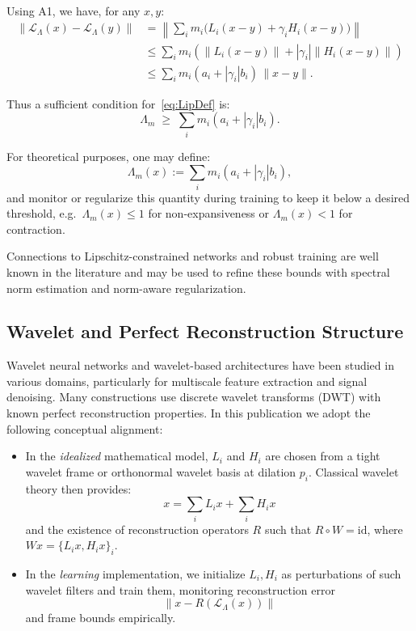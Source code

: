 \documentclass[11pt]{article}
\begin{document}
Using A1, we have, for any $x,y$:
\begin{align}
  \|\mathcal{L}_\Lambda(x) - \mathcal{L}_\Lambda(y)\|
  &= \left\|\sum_i m_i \bigl(L_i (x-y) + \gamma_i H_i (x-y)\bigr)\right\| \nonumber\\[3pt]
  &\le \sum_i m_i \left(\|L_i(x-y)\| + |\gamma_i|\|H_i(x-y)\|\right) \nonumber\\[3pt]
  &\le \sum_i m_i (a_i + |\gamma_i|b_i) \,\|x-y\|.
\end{align}

Thus a sufficient condition for~\eqref{eq:LipDef} is:
\begin{equation}
  \Lambda_m \;\ge\; \sum_i m_i (a_i + |\gamma_i|b_i).
\end{equation}

For theoretical purposes, one may define:
\[
  \Lambda_m(x) := \sum_i m_i (a_i + |\gamma_i|b_i),
\]
and monitor or regularize this quantity during training to keep it below a desired threshold, e.g.\ $\Lambda_m(x) \le 1$ for non-expansiveness or $\Lambda_m(x) < 1$ for contraction.

Connections to Lipschitz-constrained networks and robust training are well known in the literature and may be used to refine these bounds with spectral norm estimation and norm-aware regularization.

\subsection{Wavelet and Perfect Reconstruction Structure}

Wavelet neural networks and wavelet-based architectures have been studied in various domains, particularly for multiscale feature extraction and signal denoising. Many constructions use discrete wavelet transforms (DWT) with known perfect reconstruction properties. In this publication we adopt the following conceptual alignment:

\begin{itemize}
  \item In the \emph{idealized} mathematical model, $L_i$ and $H_i$ are chosen from a tight wavelet frame or orthonormal wavelet basis at dilation $p_i$. Classical wavelet theory then provides:
  \[
    x
    = \sum_i L_i x + \sum_i H_i x
  \]
  and the existence of reconstruction operators $R$ such that $R \circ W = \mathrm{id}$, where $W x = \{L_i x, H_i x\}_i$.

  \item In the \emph{learning} implementation, we initialize $L_i,H_i$ as perturbations of such wavelet filters and train them, monitoring reconstruction error
  \[
    \|x - R(\mathcal{L}_\Lambda(x))\|
  \]
  and frame bounds empirically.
\end{itemize}
\end{document}
